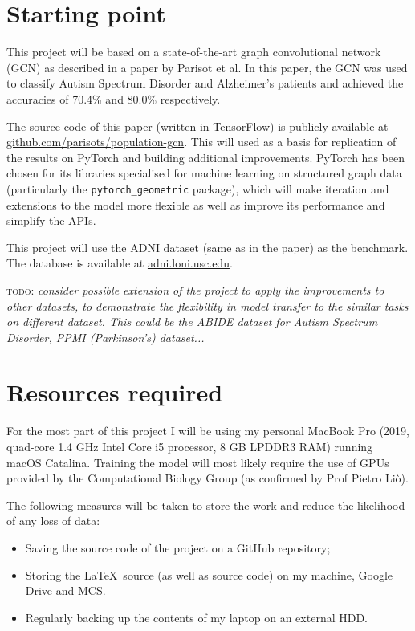 \documentclass[12pt,a4paper,twoside]{article}
\begin{document}
\section*{Starting point}


This project will be based on a state-of-the-art graph convolutional network (GCN) as described in a paper by Parisot et al. \cite{parisot2018disease} In this paper, the GCN was used to classify Autism Spectrum Disorder and Alzheimer's patients and achieved the accuracies of 70.4\% and 80.0\% respectively. 

The source code of this paper (written in TensorFlow) is publicly available at \url{github.com/parisots/population-gcn}. This will used as a basis for replication of the results on PyTorch and building additional improvements. PyTorch has been chosen for its libraries specialised for machine learning on structured graph data (particularly the \texttt{pytorch\_geometric} package), which will make iteration and extensions to the model more flexible as well as improve its performance and simplify the APIs.

This project will use the ADNI dataset (same as in the paper) as the benchmark. The database is available at \url{adni.loni.usc.edu}.

\textsc{todo:} \textit{consider possible extension of the project to apply the improvements to other datasets, to demonstrate the flexibility in model transfer to the similar tasks on different dataset. This could be the ABIDE dataset for Autism Spectrum Disorder, PPMI (Parkinson's) dataset...}

\section*{Resources required}

For the most part of this project I will be using my personal MacBook Pro (2019, quad-core 1.4 GHz Intel Core i5 processor, 8 GB LPDDR3 RAM) running macOS Catalina. Training the model will most likely require the use of GPUs provided by the Computational Biology Group (as confirmed by Prof Pietro Liò).

The following measures will be taken to store the work and reduce the likelihood of any loss of data: 
\begin{itemize}
  \item Saving the source code of the project on a GitHub repository;
  \item Storing the \LaTeX\ source (as well as source code) on my machine, Google Drive and MCS.
  \item Regularly backing up the contents of my laptop on an external HDD.
\end{itemize}
\end{document}
